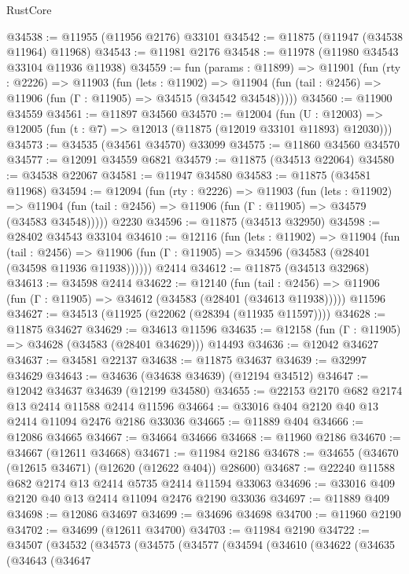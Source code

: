 \begin{lexlean}{RustCore}
\begin{coremodule}
@34538 := @11955 (@11956 @2176) @33101
@34542 := @11875 (@11947 (@34538 @11964) @11968)
@34543 := @11981 @2176
@34548 := @11978 (@11980 @34543 @33104 @11936 @11938)
@34559 := fun (params : @11899) =>
  @11901
    (fun (rty : @2226) =>
    @11903
      (fun (lets : @11902) =>
      @11904 (fun (tail : @2456) => @11906 (fun (Γ : @11905) => @34515 (@34542 @34548)))))
@34560 := @11900 @34559
@34561 := @11897 @34560
@34570 := @12004
    (fun (U : @12003) => @12005 (fun (t : @7) => @12013 (@11875 (@12019 @33101 @11893) @12030)))
@34573 := @34535 (@34561 @34570) @33099
@34575 := @11860 @34560 @34570
@34577 := @12091 @34559 @6821
@34579 := @11875 (@34513 @22064)
@34580 := @34538 @22067
@34581 := @11947 @34580
@34583 := @11875 (@34581 @11968)
@34594 := @12094
    (fun (rty : @2226) =>
    @11903
      (fun (lets : @11902) =>
      @11904 (fun (tail : @2456) => @11906 (fun (Γ : @11905) => @34579 (@34583 @34548)))))
    @2230
@34596 := @11875 (@34513 @32950)
@34598 := @28402 @34543 @33104
@34610 := @12116
    (fun (lets : @11902) =>
    @11904
      (fun (tail : @2456) =>
      @11906 (fun (Γ : @11905) => @34596 (@34583 (@28401 (@34598 @11936 @11938))))))
    @2414
@34612 := @11875 (@34513 @32968)
@34613 := @34598 @2414
@34622 := @12140
    (fun (tail : @2456) => @11906 (fun (Γ : @11905) => @34612 (@34583 (@28401 (@34613 @11938)))))
    @11596
@34627 := @34513 (@11925 (@22062 (@28394 (@11935 @11597))))
@34628 := @11875 @34627
@34629 := @34613 @11596
@34635 := @12158 (fun (Γ : @11905) => @34628 (@34583 (@28401 @34629))) @14493
@34636 := @12042 @34627
@34637 := @34581 @22137
@34638 := @11875 @34637
@34639 := @32997 @34629
@34643 := @34636 (@34638 @34639) (@12194 @34512)
@34647 := @12042 @34637 @34639 (@12199 @34580)
@34655 := @22153 @2170 @682 @2174 @13 @2414 @11588 @2414 @11596
@34664 := @33016 @404 @2120 @40 @13 @2414 @11094 @2476 @2186 @33036
@34665 := @11889 @404
@34666 := @12086 @34665
@34667 := @34664 @34666
@34668 := @11960 @2186
@34670 := @34667 (@12611 @34668)
@34671 := @11984 @2186
@34678 := @34655 (@34670 (@12615 @34671) (@12620 (@12622 @404)) @28600)
@34687 := @22240 @11588 @682 @2174 @13 @2414 @5735 @2414 @11594 @33063
@34696 := @33016 @409 @2120 @40 @13 @2414 @11094 @2476 @2190 @33036
@34697 := @11889 @409
@34698 := @12086 @34697
@34699 := @34696 @34698
@34700 := @11960 @2190
@34702 := @34699 (@12611 @34700)
@34703 := @11984 @2190
@34722 := @34507
    (@34532
      (@34573
        (@34575
          (@34577
            (@34594
              (@34610
                (@34622
                  (@34635
                    (@34643
                      (@34647

\end{coremodule}
\end{lexlean}
